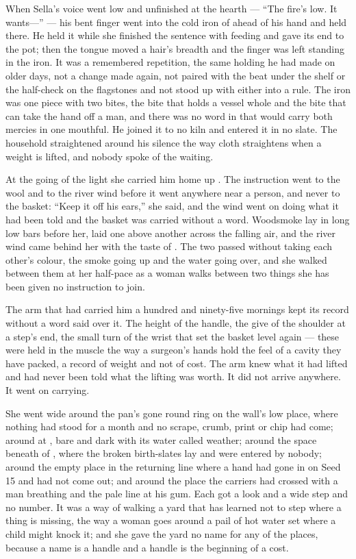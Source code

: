 When Sella's voice went low and unfinished at the hearth --- “The fire's low. It wants---” --- his bent finger went into the cold iron of  ahead of his hand and held there. He held it while she finished the sentence with feeding and gave its end to the pot; then the tongue moved a hair's breadth and the finger was left standing in the iron. It was a remembered repetition, the same holding he had made on older days, not a change made again, not paired with the beat under the shelf or the half-check on the flagstones and not stood up with either into a rule. The iron was one piece with two bites, the bite that holds a vessel whole and the bite that can take the hand off a man, and there was no word in  that would carry both mercies in one mouthful. He joined it to no kiln and entered it in no slate. The household straightened around his silence the way cloth straightens when a weight is lifted, and nobody spoke of the waiting.

\scenebreak

At the going of the light she carried him home up . The instruction went to the wool and to the river wind before it went anywhere near a person, and never to the basket: “Keep it off his ears,” she said, and the wind went on doing what it had been told and the basket was carried without a word. Woodsmoke lay in long low bars before her, laid one above another across the falling air, and the river wind came behind her with the taste of . The two passed without taking each other's colour, the smoke going up and the water going over, and she walked between them at her half-pace as a woman walks between two things she has been given no instruction to join.

The arm that had carried him a hundred and ninety-five mornings kept its record without a word said over it. The height of the handle, the give of the shoulder at a step's end, the small turn of the wrist that set the basket level again --- these were held in the muscle the way a surgeon's hands hold the feel of a cavity they have packed, a record of weight and not of cost. The arm knew what it had lifted and had never been told what the lifting was worth. It did not arrive anywhere. It went on carrying.

She went wide around the pan's gone round ring on the wall's low place, where nothing had stood for a month and no scrape, crumb, print or chip had come; around  at , bare and dark with its water called weather; around the space beneath  of , where the broken birth-slates lay and were entered by nobody; around the empty place in the returning line where a hand had gone in on Seed 15 and had not come out; and around the place the carriers had crossed with a man breathing and the pale line at his gum. Each got a look and a wide step and no number. It was a way of walking a yard that has learned not to step where a thing is missing, the way a woman goes around a pail of hot water set where a child might knock it; and she gave the yard no name for any of the places, because a name is a handle and a handle is the beginning of a cost.

